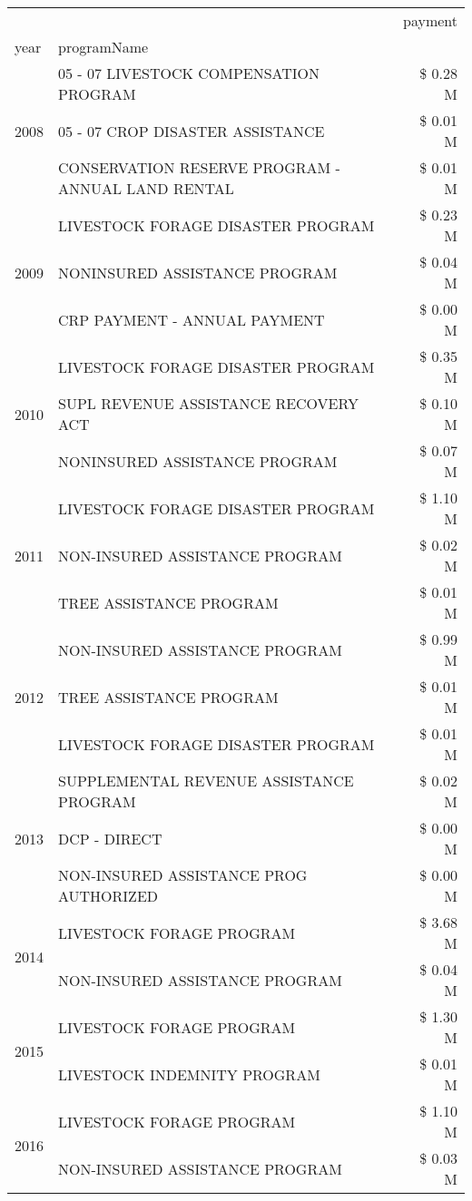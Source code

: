\begin{tabular}{llr}
\toprule
 &  & payment \\
year & programName &  \\
\midrule
\multirow[t]{3}{*}{2008} & 05 - 07 LIVESTOCK COMPENSATION PROGRAM & \$ 0.28 M \\
 & 05 - 07 CROP DISASTER ASSISTANCE & \$ 0.01 M \\
 & CONSERVATION RESERVE PROGRAM - ANNUAL LAND RENTAL & \$ 0.01 M \\
\cline{1-3}
\multirow[t]{3}{*}{2009} & LIVESTOCK FORAGE DISASTER  PROGRAM & \$ 0.23 M \\
 & NONINSURED ASSISTANCE PROGRAM & \$ 0.04 M \\
 & CRP PAYMENT - ANNUAL PAYMENT & \$ 0.00 M \\
\cline{1-3}
\multirow[t]{3}{*}{2010} & LIVESTOCK FORAGE DISASTER  PROGRAM & \$ 0.35 M \\
 & SUPL REVENUE ASSISTANCE RECOVERY ACT & \$ 0.10 M \\
 & NONINSURED ASSISTANCE PROGRAM & \$ 0.07 M \\
\cline{1-3}
\multirow[t]{3}{*}{2011} & LIVESTOCK FORAGE DISASTER PROGRAM & \$ 1.10 M \\
 & NON-INSURED ASSISTANCE PROGRAM & \$ 0.02 M \\
 & TREE ASSISTANCE PROGRAM & \$ 0.01 M \\
\cline{1-3}
\multirow[t]{3}{*}{2012} & NON-INSURED ASSISTANCE PROGRAM & \$ 0.99 M \\
 & TREE ASSISTANCE PROGRAM & \$ 0.01 M \\
 & LIVESTOCK FORAGE DISASTER PROGRAM & \$ 0.01 M \\
\cline{1-3}
\multirow[t]{3}{*}{2013} & SUPPLEMENTAL REVENUE ASSISTANCE PROGRAM & \$ 0.02 M \\
 & DCP - DIRECT & \$ 0.00 M \\
 & NON-INSURED ASSISTANCE PROG AUTHORIZED & \$ 0.00 M \\
\cline{1-3}
\multirow[t]{2}{*}{2014} & LIVESTOCK FORAGE PROGRAM & \$ 3.68 M \\
 & NON-INSURED ASSISTANCE PROGRAM & \$ 0.04 M \\
\cline{1-3}
\multirow[t]{2}{*}{2015} & LIVESTOCK FORAGE PROGRAM & \$ 1.30 M \\
 & LIVESTOCK INDEMNITY PROGRAM & \$ 0.01 M \\
\cline{1-3}
\multirow[t]{3}{*}{2016} & LIVESTOCK FORAGE PROGRAM & \$ 1.10 M \\
 & NON-INSURED ASSISTANCE PROGRAM & \$ 0.03 M \\

\end{tabular}
